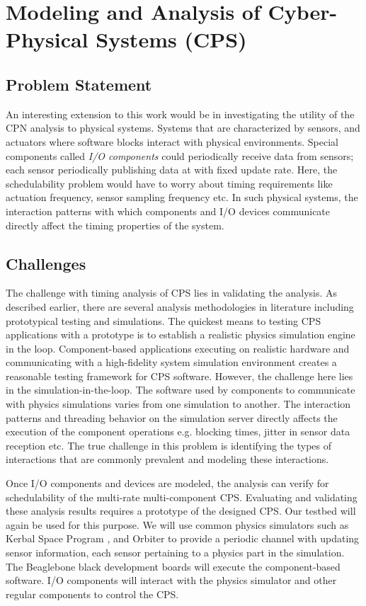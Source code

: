 \newpage
\section{Modeling and Analysis of Cyber-Physical Systems (CPS)}

\subsection{Problem Statement}

An interesting extension to this work would be in investigating the utility of the CPN analysis to physical systems. Systems that are characterized by sensors, and actuators where software blocks interact with physical environments. Special components called \emph{I/O components} could periodically receive data from sensors; each sensor periodically publishing data at with fixed update rate. Here, the schedulability problem would have to worry about timing requirements like actuation frequency, sensor sampling frequency etc. In such physical systems, the interaction patterns with which components and I/O devices communicate directly affect the timing properties of the system. 

\subsection{Challenges}

The challenge with timing analysis of CPS lies in validating the analysis. As described earlier, there are several analysis methodologies in literature including prototypical testing and simulations. The quickest means to testing CPS applications with a prototype is to establish a realistic physics simulation engine in the loop. Component-based applications executing on realistic hardware and communicating with a high-fidelity system simulation environment creates a reasonable testing framework for CPS software. However, the challenge here lies in the simulation-in-the-loop. The software used by components to communicate with physics simulations varies from one simulation to another. The interaction patterns and threading behavior on the simulation server directly affects the execution of the component operations e.g. blocking times, jitter in sensor data reception etc. The true challenge in this problem is identifying the types of interactions that are commonly prevalent and modeling these interactions. 

Once I/O components and devices are modeled, the analysis can verify for schedulability of the multi-rate multi-component CPS. Evaluating and validating these analysis results requires a prototype of the designed CPS. Our testbed \cite{kumarTestbed} will again be used for this purpose. We will use common physics simulators such as Kerbal Space Program \cite{KSP}, and Orbiter \cite{Orbiter} to provide a periodic channel with updating sensor information, each sensor pertaining to a physics part in the simulation. The Beaglebone black development boards will execute the component-based software. I/O components will interact with the physics simulator and other regular components to control the CPS.

